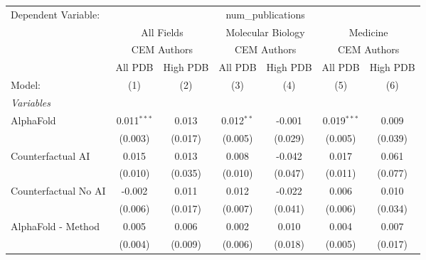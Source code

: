 \begingroup
\centering
\begin{tabular}{lcccccc}
   \tabularnewline \midrule \midrule
   Dependent Variable: & \multicolumn{6}{c}{num\_publications}\\
 & \multicolumn{2}{c}{All Fields} & \multicolumn{2}{c}{Molecular Biology} & \multicolumn{2}{c}{Medicine} \\
\cmidrule(lr){2-3} \cmidrule(lr){4-5} \cmidrule(lr){6-7}
 & \multicolumn{2}{c}{CEM Authors} & \multicolumn{2}{c}{CEM Authors} & \multicolumn{2}{c}{CEM Authors} \\
\cmidrule(lr){2-3} \cmidrule(lr){4-5} \cmidrule(lr){6-7}
 & \multicolumn{1}{c}{All PDB} & \multicolumn{1}{c}{High PDB} & \multicolumn{1}{c}{All PDB} & \multicolumn{1}{c}{High PDB} & \multicolumn{1}{c}{All PDB} & \multicolumn{1}{c}{High PDB} \\
\cmidrule(lr){2-2} \cmidrule(lr){3-3} \cmidrule(lr){4-4} \cmidrule(lr){5-5} \cmidrule(lr){6-6} \cmidrule(lr){7-7}
   Model:                                                     & (1)            & (2)     & (3)           & (4)           & (5)            & (6)\\  
   \midrule
   \emph{Variables}\\
   AlphaFold                                                  & 0.011$^{***}$  & 0.013   & 0.012$^{**}$  & -0.001        & 0.019$^{***}$  & 0.009\\   
                                                              & (0.003)        & (0.017) & (0.005)       & (0.029)       & (0.005)        & (0.039)\\   
   Counterfactual AI                                          & 0.015          & 0.013   & 0.008         & -0.042        & 0.017          & 0.061\\   
                                                              & (0.010)        & (0.035) & (0.010)       & (0.047)       & (0.011)        & (0.077)\\   
   Counterfactual No AI                                       & -0.002         & 0.011   & 0.012         & -0.022        & 0.006          & 0.010\\   
                                                              & (0.006)        & (0.017) & (0.007)       & (0.041)       & (0.006)        & (0.034)\\   
   AlphaFold - Method                                         & 0.005          & 0.006   & 0.002         & 0.010         & 0.004          & 0.007\\   
                                                              & (0.004)        & (0.009) & (0.006)       & (0.018)       & (0.005)        & (0.017)\\   

\end{tabular}
